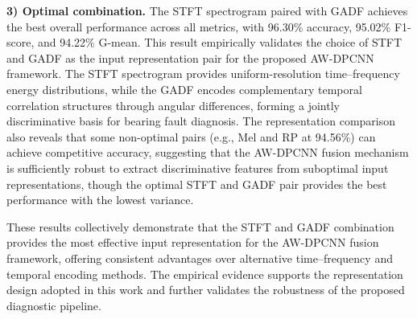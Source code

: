 \documentclass[pdflatex,sn-mathphys-num]{sn-jnl}
\theoremstyle{thmstyleone}%
\theoremstyle{thmstyletwo}%
\theoremstyle{thmstylethree}%
\begin{document}
\textbf{3) Optimal combination.} The STFT spectrogram paired with GADF achieves the best overall performance across all metrics, with 96.30\% accuracy, 95.02\% F1-score, and 94.22\% G-mean. This result empirically validates the choice of STFT and GADF as the input representation pair for the proposed AW-DPCNN framework. The STFT spectrogram provides uniform-resolution time--frequency energy distributions, while the GADF encodes complementary temporal correlation structures through angular differences, forming a jointly discriminative basis for bearing fault diagnosis. The representation comparison also reveals that some non-optimal pairs (e.g., Mel and RP at 94.56\%) can achieve competitive accuracy, suggesting that the AW-DPCNN fusion mechanism is sufficiently robust to extract discriminative features from suboptimal input representations, though the optimal STFT and GADF pair provides the best performance with the lowest variance.

These results collectively demonstrate that the STFT and GADF combination provides the most effective input representation for the AW-DPCNN fusion framework, offering consistent advantages over alternative time--frequency and temporal encoding methods. The empirical evidence supports the representation design adopted in this work and further validates the robustness of the proposed diagnostic pipeline.
\end{document}
